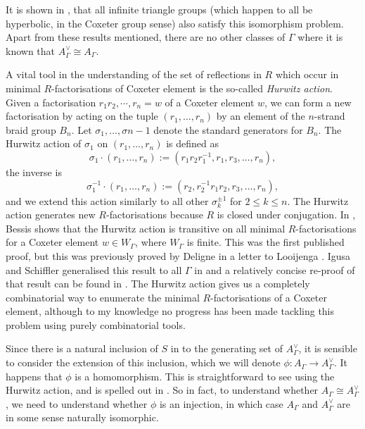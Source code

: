 It is shown in \cite{delucchi_etal_dual_2024}, that all infinite triangle groups (which happen to all be hyperbolic, in the Coxeter group sense) also satisfy this isomorphism problem.
Apart from these results mentioned, there are no other classes of $\Gamma$ where it is known that $A^\vee_\Gamma \cong A_\Gamma$.

A vital tool in the understanding of the set of reflections in $R$ which occur in minimal $R$-factorisations of Coxeter element is the so-called \emph{Hurwitz action}.
Given a factorisation $r_1r_2, \cdots ,r_n=w$ of a Coxeter element $w$, we can form a new factorisation by acting on the tuple  $(r_1, \ldots, r_n)$ by an element of the $n$-strand braid group  $B_n$.
Let  $\sigma_1, \ldots , \sigma{n-1}$ denote the standard generators for $B_n$.
The Hurwitz action of  $\sigma_1$ on  $(r_1, \ldots, r_n)$ is defined as
\[
	\sigma_1 \cdot (r_1, \ldots, r_n) := (r_1r_2r_1^{-1}, r_1, r_3, \ldots, r_n)
	,\]
the inverse is
\[
	\sigma_1^{-1} \cdot (r_1, \ldots, r_n) := (r_2, r_2^{-1}r_1r_2, r_3, \ldots, r_n)
	,\]
and we extend this action similarly to all other $\sigma_k^{\pm 1}$ for  $2\leq k \leq n$.
The Hurwitz action generates new  $R$-factorisations because  $R$ is closed under conjugation.
In \cite{bessis_dual_2003}, Bessis shows that the Hurwitz action is transitive on all minimal  $R$-factorisations for a Coxeter element  $w \in W_\Gamma$, where  $W_\Gamma$ is finite.
This was the first published proof, but this was previously proved by Deligne in a letter to Looijenga \cite{deligne_letter_1974}.
Igusa and Schiffler generalised this result to all $\Gamma$ in \cite{igusa_schiffler_exceptional_2010} and a relatively concise re-proof of that result can be found in \cite{baumeister_etal_note_2014}.
The Hurwitz action gives us a completely combinatorial way to enumerate the minimal $R$-factorisations of a Coxeter element, although to my knowledge no progress has been made tackling this problem using purely combinatorial tools.

Since there is a natural inclusion of $S$ in to the generating set of  $A^\vee_\Gamma$, it is sensible to consider the extension of this inclusion, which we will denote $\phi \colon A_\Gamma \to A^\vee_\Gamma$.
It happens that $\phi$ is a homomorphism.
This is straightforward to see using the Hurwitz action, and is spelled out in \cite[Proposition 10.1]{mccammond_sulway_artin_2017}.
So in fact, to understand whether $A_\Gamma \cong A^\vee_\Gamma$, we need to understand whether $\phi$ is an injection, in which case $A_\Gamma$ and  $A^\vee_\Gamma$ are in some sense naturally isomorphic.

